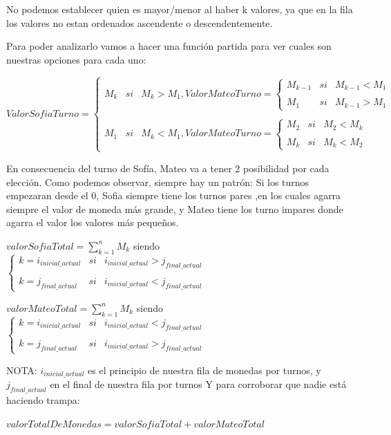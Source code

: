 No podemos establecer quien es mayor/menor al haber k valores, ya que en la fila los valores no estan ordenados ascendente o descendentemente.

Para poder analizarlo vamos a hacer una función partida para ver cuales son nuestras opciones para cada uno:

$ValorSofiaTurno= \left\{ \begin{array}{lcc} M_{k} & si & M_{k}>M_{1} , ValorMateoTurno= \left\{ \begin{array}{lcc} M_{k-1} & si & M_{k-1}<M_{1} \\ \\ M_{1} & si & M_{k-1} > M_{1} \end{array} \right. \\ \\ M_{1} & si & M_{k} < M_{1}, ValorMateoTurno= \left\{ \begin{array}{lcc} M_{2} & si & M_{2}<M_{k} \\ \\ M_{k} & si & M_{k} < M_{2} \end{array} \right. \end{array} \right.$

En consecuencia del turno de Sofía, Mateo va a tener 2 posibilidad por cada elección.
\vskip1cm
Como podemos observar, siempre hay un patrón: Si los turnos empezaran desde el 0, Sofia siempre tiene los turnos pares
,en los cuales agarra siempre el valor de moneda más grande, y Mateo tiene los turno impares donde agarra el valor los valores más pequeños.

\vskip0.5cm

\vskip0.5cm
$valorSofiaTotal =  \sum_{k=1}^{n}M_{k}$ siendo $\left\{ \begin{array}{lcc} k=i_{inicial\_actual} & si & i_{inicial\_actual}>j_{final\_actual} \\ \\ k=j_{final\_actual} & si & i_{inicial\_actual}<j_{final\_actual} \end{array} \right.$

\vskip0.5cm
$valorMateoTotal =  \sum_{k=1}^{n}M_{k}$ siendo $\left\{ \begin{array}{lcc} k=i_{inicial\_actual} & si & i_{inicial\_actual}<j_{final\_actual} \\ \\ k=j_{final\_actual} & si & i_{inicial\_actual}>j_{final\_actual} \end{array} \right.$

\vskip0.5cm
NOTA: $i_{inicial\_actual}$ es el principio de nuestra fila de monedas por turnos, y $j_{final\_actual}$ en el final de nuestra fila por turnos 
\vskip1cm
Y para corroborar que nadie está haciendo trampa:
\vskip0.5cm
\begin{center}
    $valorTotalDeMonedas=valorSofiaTotal+valorMateoTotal$
\end{center}


